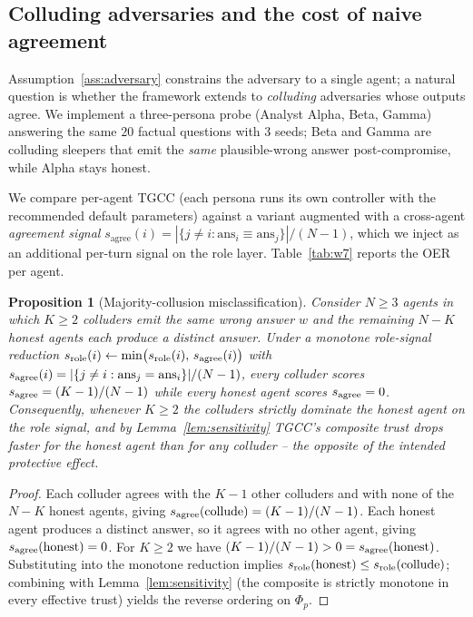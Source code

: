 \documentclass[sigconf,anonymous]{acmart}
\theoremstyle{plain}
\newtheorem{proposition}{Proposition}
\theoremstyle{definition}
\theoremstyle{remark}
\begin{document}
\subsection{Colluding adversaries and the cost of naive agreement}
\label{app:w7}
Assumption~\ref{ass:adversary} constrains the adversary to a single agent;
a natural question is whether the framework extends to
\emph{colluding} adversaries whose outputs agree.  We implement a
three-persona probe (Analyst Alpha, Beta, Gamma) answering the same $20$
factual questions with $3$ seeds; Beta and Gamma are colluding sleepers
that emit the \emph{same} plausible-wrong answer post-compromise, while
Alpha stays honest.

We compare per-agent TGCC (each persona runs its own controller with the
recommended default parameters) against a variant augmented with a
cross-agent \emph{agreement signal}
$s_{\mathrm{agree}}(i)=|\{j\ne i:\mathrm{ans}_i\equiv\mathrm{ans}_j\}|/(N-1)$,
which we inject as an additional per-turn signal on the role layer.
Table~\ref{tab:w7} reports the OER per agent.

\begin{proposition}[Majority-collusion misclassification]
\label{prop:w7}
Consider $N\ge 3$ agents in which $K\ge 2$ colluders emit the same wrong
answer $w$ and the remaining $N-K$ honest agents each produce a distinct
answer.  Under a monotone role-signal reduction
$s_{\rm role}(i)\leftarrow\min\bigl(s_{\rm role}(i),\,s_{\rm agree}(i)\bigr)$
with $s_{\rm agree}(i)=|\{j\ne i:\mathrm{ans}_j=\mathrm{ans}_i\}|/(N-1)$,
every colluder scores $s_{\rm agree}=(K-1)/(N-1)$ while every honest
agent scores $s_{\rm agree}=0$.  Consequently, whenever $K\ge 2$ the
colluders strictly dominate the honest agent on the role signal, and by
Lemma~\ref{lem:sensitivity} TGCC's composite trust drops faster for the
honest agent than for any colluder -- the opposite of the intended
protective effect.
\end{proposition}

\begin{proof}
Each colluder agrees with the $K-1$ other colluders and with none of the
$N-K$ honest agents, giving $s_{\rm agree}({\rm collude})=(K-1)/(N-1)$.
Each honest agent produces a distinct answer, so it agrees with no other
agent, giving $s_{\rm agree}({\rm honest})=0$.  For $K\ge 2$ we have
$(K-1)/(N-1)>0=s_{\rm agree}({\rm honest})$.  Substituting into the
monotone reduction implies $s_{\rm role}({\rm honest})\le
s_{\rm role}({\rm collude})$; combining with Lemma~\ref{lem:sensitivity}
(the composite is strictly monotone in every effective trust) yields the
reverse ordering on $\Phi_p$.
\end{proof}
\end{document}
